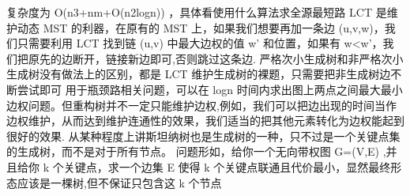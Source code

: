 {}复杂度为\markdownRendererDollarSign{} O(n\markdownRendererCircumflex{}3+nm+O(n\markdownRendererCircumflex{}2logn)) \markdownRendererDollarSign{}，具体看使用什么算法求全源最短路\markdownRendererInterblockSeparator
{}\markdownRendererInterblockSeparator
{}
\markdownRendererSectionEnd \markdownRendererSectionBegin
{}\markdownRendererInterblockSeparator
{}\markdownRendererDollarSign{}LCT\markdownRendererDollarSign{} 是维护动态 \markdownRendererDollarSign{}MST\markdownRendererDollarSign{} 的利器，在原有的 \markdownRendererDollarSign{}MST\markdownRendererDollarSign{} 上，如果我们想要再加一条边 \markdownRendererDollarSign{}(u,v,w)\markdownRendererDollarSign{}，我们只需要利用 \markdownRendererDollarSign{}LCT\markdownRendererDollarSign{} 找到链 \markdownRendererDollarSign{}(u,v)\markdownRendererDollarSign{} 中最大边权的值 \markdownRendererDollarSign{}w'\markdownRendererDollarSign{} 和位置，如果有 \markdownRendererDollarSign{}w<w'\markdownRendererDollarSign{}，我们把原先的边断开，链接新边即可,否则跳过这条边.\markdownRendererInterblockSeparator
{}\markdownRendererSectionBegin
{}\markdownRendererInterblockSeparator
{}严格次小生成树和非严格次小生成树没有做法上的区别，都是 \markdownRendererDollarSign{}LCT\markdownRendererDollarSign{} 维护生成树的裸题，只需要把非生成树边不断尝试即可\markdownRendererInterblockSeparator
{}
\markdownRendererSectionEnd 
\markdownRendererSectionEnd \markdownRendererSectionBegin
{}\markdownRendererInterblockSeparator
{}用于瓶颈路相关问题，可以在\markdownRendererDollarSign{} logn \markdownRendererDollarSign{}时间内求出图上两点之间最大最小边权问题。但重构树并不一定只能维护边权,例如，我们可以把边出现的时间当作边权维护，从而达到维护连通性的效果，我们适当的把其他元素转化为边权能起到很好的效果.\markdownRendererInterblockSeparator
{}\markdownRendererInterblockSeparator
{}
\markdownRendererSectionEnd \markdownRendererSectionBegin
{}\markdownRendererInterblockSeparator
{}从某种程度上讲斯坦纳树也是生成树的一种，只不过是一个关键点集的生成树，而不是对于所有节点。\markdownRendererParagraphSeparator
{}问题形如，给你一个无向带权图\markdownRendererDollarSign{} G=(V,E) \markdownRendererDollarSign{},并且给你\markdownRendererDollarSign{} k\markdownRendererSoftLineBreak
{}\markdownRendererDollarSign{}个关键点，求一个边集\markdownRendererDollarSign{} E \markdownRendererDollarSign{}使得\markdownRendererDollarSign{} k \markdownRendererDollarSign{}个关键点联通且代价最小，显然最终形态应该是一棵树,但不保证只包含这\markdownRendererDollarSign{} k \markdownRendererDollarSign{}个节点\markdownRendererParagraphSeparator
